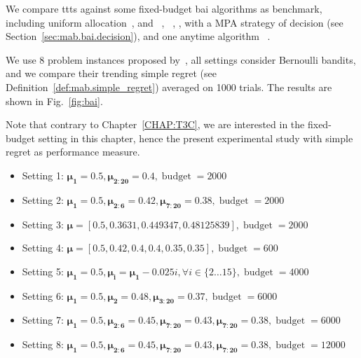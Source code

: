We compare \gls{ttts} against some fixed-budget \gls{bai} algorithms as benchmark, including uniform allocation~\citep{bubeck2009pure}, \UCBE{} and \SR{}~\citep{audibert2010budget}, \UGapE~\citep{gabillon2012ugape}, \SHA{}, \TS{} with a MPA strategy of decision (see Section~\ref{sec:mab.bai.decision}), and one anytime algorithm \ATLUCB{}~\citep{jun2016atlucb}.

We use 8 problem instances proposed by~\cite{audibert2010budget}, all settings consider Bernoulli bandits, and we compare their trending \gls{simple regret} (see Definition~\ref{def:mab.simple_regret}) averaged on 1000 trials. The results are shown in Fig.~\ref{fig:bai}.

Note that contrary to Chapter~\ref{CHAP:T3C}, we are interested in the fixed-budget setting in this chapter, hence the present experimental study with simple regret as performance measure.

\begin{itemize}
	\item Setting 1: $\mathbf{\mu_1}=0.5, \mathbf{\mu_{2:20}}=0.4, \operatorname{budget}=2000$
	\item Setting 2: $\mathbf{\mu_1}=0.5, \mathbf{\mu_{2:6}}=0.42, \mathbf{\mu_{7:20}}=0.38, \operatorname{budget}=2000$
	\item Setting 3: $\mathbf{\mu}=[0.5, 0.3631, 0.449347, 0.48125839], \operatorname{budget}=2000$
	\item Setting 4: $\mathbf{\mu}=[0.5, 0.42, 0.4, 0.4, 0.35, 0.35], \operatorname{budget}=600$
	\item Setting 5: $\mathbf{\mu_1}=0.5, \mathbf{\mu_i}=\mathbf{\mu_1}-0.025i, \forall i\in\{2\ldots15\}, \operatorname{budget}=4000$
	\item Setting 6: $\mathbf{\mu_1}=0.5, \mathbf{\mu_2}=0.48, \mathbf{\mu_{3:20}}=0.37, \operatorname{budget}=6000$
	\item Setting 7: $\mathbf{\mu_1}=0.5, \mathbf{\mu_{2:6}}=0.45, \mathbf{\mu_{7:20}}=0.43, \mathbf{\mu_{7:20}}=0.38, \operatorname{budget}=6000$
	\item Setting 8: $\mathbf{\mu_1}=0.5, \mathbf{\mu_{2:6}}=0.45, \mathbf{\mu_{7:20}}=0.43, \mathbf{\mu_{7:20}}=0.38, \operatorname{budget}=12000$
\end{itemize}

